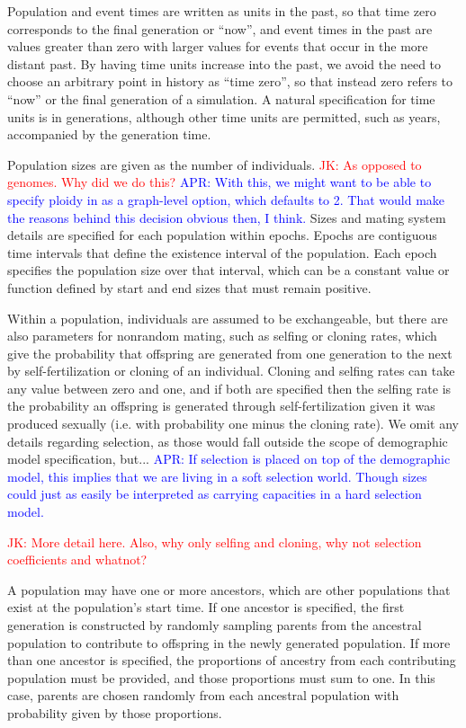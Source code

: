 \documentclass[11pt]{article}
\newcommand{\aprcomment}[1]{{\textcolor{blue}{APR: #1}}}
\newcommand{\jkcomment}[1]{{\textcolor{red}{JK: #1}}}
\begin{document}
Population and event times are written as units in the past, so that time zero
corresponds to the final generation or ``now'', and event times in the past are
values greater than zero with larger values for events that occur in the more
distant past. By having time units increase into the past, we avoid the need to
choose an arbitrary point in history as ``time zero'', so that instead zero
refers to ``now'' or the final generation of a simulation. A natural
specification for time units is in generations, although other time units are
permitted, such as years, accompanied by the generation time.

Population sizes are given as the number of individuals.
\jkcomment{As opposed to genomes. Why did we do this?}
\aprcomment{With this, we might want to be able to specify ploidy in as
a graph-level option, which defaults to 2. That would make the reasons
behind this decision obvious then, I think.}
Sizes and mating system details are specified for each population within
epochs. Epochs are contiguous time intervals that define
the existence interval of the population. Each epoch specifies the population size
over that interval, which can be a constant value or function defined by start
and end sizes that must remain positive.

Within a population, individuals are assumed to be exchangeable, but there are
also parameters for nonrandom mating, such as selfing or cloning rates, which
give the probability that offspring are generated from one generation to the
next by self-fertilization or cloning of an individual. Cloning and selfing
rates can take any value between zero and one, and if both are specified then
the selfing rate is the probability an offspring is generated through
self-fertilization given it was produced sexually (i.e. with probability one
minus the cloning rate). We omit any details regarding selection, as those would
fall outside the scope of demographic model specification, but...
\aprcomment{If selection is placed on top of the demographic model, this implies
that we are living in a soft selection world. Though sizes could just as easily
be interpreted as carrying capacities in a hard selection model.}

\jkcomment{More detail here. Also, why only selfing and cloning, why not selection
coefficients and whatnot?}

A population may have one
or more ancestors, which are other populations that exist at the population's
start time. If one ancestor is specified, the first generation is constructed
by randomly sampling parents from the ancestral population to contribute to
offspring in the newly generated population. If more than one ancestor is
specified, the proportions of ancestry from each contributing population must
be provided, and those proportions must sum to one. In this case, parents are
chosen randomly from each ancestral population with probability given by those
proportions.
\end{document}
